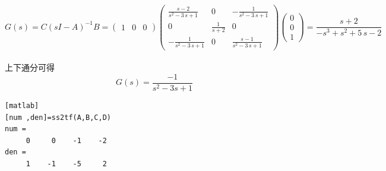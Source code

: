 \documentclass[a4paper]{article}
\begin{document}
$$ G(s)=C(sI-A)^{-1}B = \left(\begin{array}{ccc} 1 & 0 & 0 \end{array}\right) \left(\begin{array}{ccc} \frac{s - 2}{s^2 - 3\, s + 1} & 0 & -\frac{1}{s^2 - 3\, s + 1}\\ 0 & \frac{1}{s + 2} & 0\\ -\frac{1}{s^2 - 3\, s + 1} & 0 & \frac{s - 1}{s^2 - 3\, s + 1} \end{array}\right) \left(\begin{array}{c} 0\\ 0\\ 1 \end{array}\right) =   \frac{s + 2}{ - s^3 + s^2 + 5\, s - 2} $$ \\
\mbox{上下通分可得 } \\
$$G(s)= \frac{-1}{ s^2 -3s +1} $$
\begin{verbatim}[matlab]
[num ,den]=ss2tf(A,B,C,D)
num =
     0     0    -1    -2
den =
     1    -1    -5     2
\end{verbatim} 
\end{document}

